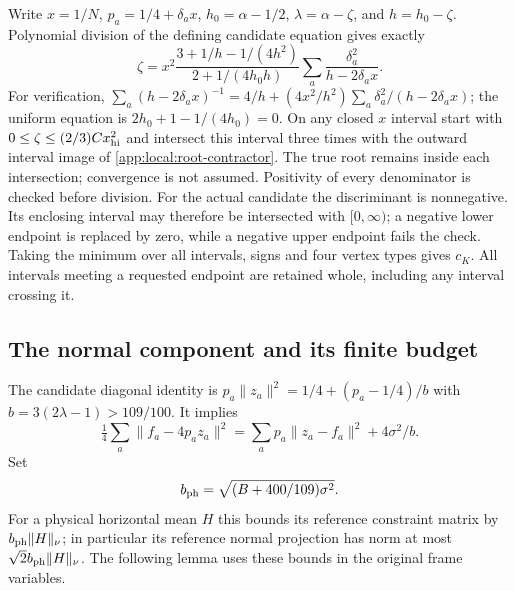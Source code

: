 Write $x=1/N$, $p_a=1/4+\delta_ax$, $h_0=\alpha-1/2$,
$\lambda=\alpha-\zeta$, and $h=h_0-\zeta$.
Polynomial division of the defining candidate equation gives exactly
\begin{equation}\label{app:local:root-contractor}
 \zeta=x^2
 \frac{3+1/h-1/(4h^2)}{2+1/(4h_0h)}
                 \sum_a\frac{\delta_a^2}{h-2\delta_ax}.
\end{equation}
For verification,
$\sum_a(h-2\delta_ax)^{-1}
=4/h+(4x^2/h^2)\sum_a\delta_a^2/(h-2\delta_ax)$;
the uniform equation is $2h_0+1-1/(4h_0)=0$.
On any closed $x$ interval start with
$0\le\zeta\le(2/3)Cx_{\rm hi}^2$ and intersect this interval three times
with the outward interval image of \eqref{app:local:root-contractor}.
The true root remains inside each intersection; convergence is not
assumed. Positivity of every denominator is checked before division.
For the actual candidate the discriminant is nonnegative. Its enclosing
interval may therefore be intersected with $[0,\infty)$; a negative lower
endpoint is replaced by zero, while a negative upper endpoint fails the check.
Taking the minimum over all intervals, signs and four vertex types gives
$c_K$. All intervals meeting a requested endpoint are retained whole,
including any interval crossing it.

\subsection{The normal component and its finite budget}
\label{app:local:normal}

The candidate diagonal identity is
$p_a\|z_a\|^2=1/4+(p_a-1/4)/b$ with
$b=3(2\lambda-1)>109/100$. It implies
\[
 \tfrac14\sum_a\|f_a-4p_az_a\|^2
 =\sum_ap_a\|z_a-f_a\|^2+4\sigma^2/b .
\]
Set
\[
 b_{\rm ph}=\sqrt{(B+400/109)\sigma^2}.
\]
For a physical horizontal mean $H$ this bounds its reference constraint
matrix by $b_{\rm ph}\|H\|_\nu$; in particular its reference normal
projection has norm at most $\sqrt2b_{\rm ph}\|H\|_\nu$.
The following lemma uses these bounds in the original frame variables.

